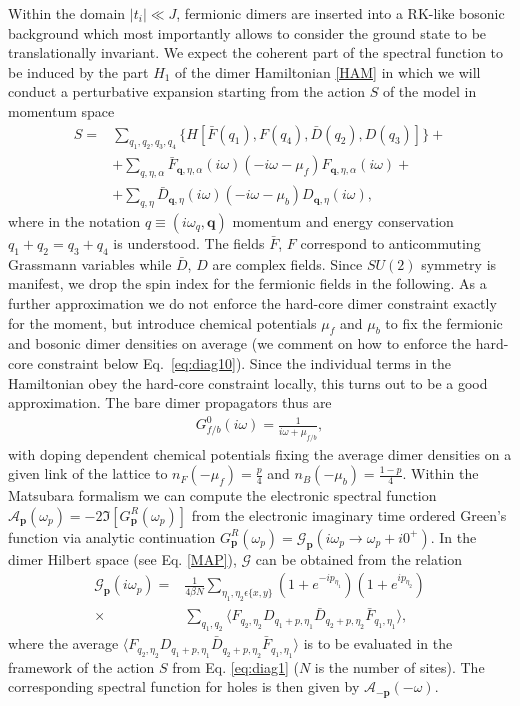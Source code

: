 \documentclass[aps,pra,reprint,showpacs,superscriptaddress]{revtex4-1}
\newcommand\bs[1]{\ensuremath{\boldsymbol{#1}}}
\begin{document}
Within the domain $|t_i|\ll J$, fermionic dimers are inserted into a RK-like bosonic background which most importantly allows to consider the ground state to be translationally invariant. We expect the coherent part of the spectral function to be induced by the part $H_1$ of the dimer Hamiltonian  \eqref{HAM} in which we will conduct a perturbative expansion starting from the action $S$ of the model in momentum space
\begin{align}
S= &\sum_{q_1,q_2,q_3,q_4} \biggl\{ H\left[\bar{F}(q_1),F(q_4),\bar{D}(q_2),D(q_3)\right]\biggr\}+ \label{eq:diag1} \\
&+ \sum_{q,\eta,\alpha}\bar{F}_{\bs{q},\eta,\alpha}(i\omega)\left(-i\omega-\mu_f\right)F_{\bs{q},\eta,\alpha}(i\omega)+ \nonumber\\
&+ \sum_{q,\eta}\bar{D}_{\bs{q},\eta}(i\omega)\left(-i\omega-\mu_b\right)D_{\bs{q},\eta}(i\omega),\nonumber
\end{align}
where in the notation $q\equiv (i\omega_q, \bs{q})$ momentum and energy conservation $q_1+q_2=q_3+q_4$ is understood. The fields $\bar{F}$, $F$ correspond to anticommuting Grassmann variables while $\bar{D}$, $D$ are complex fields. Since $SU(2)$ symmetry is manifest, we drop the spin index for the fermionic fields in the following. As a further approximation we do not enforce the hard-core dimer constraint exactly for the moment, but introduce chemical potentials $\mu_f$ and $\mu_b$ to fix the fermionic and bosonic dimer densities on average (we comment on how to enforce the hard-core constraint below Eq.~\eqref{eq:diag10}). Since the individual terms in the Hamiltonian obey the hard-core constraint locally, this turns out to be a good approximation. The bare dimer propagators thus are 
\begin{align}
G_{f/b}^0(i\omega)=\frac{1}{i\omega+\mu_{f/b}}, \label{eq:diag2}
\end{align}
with doping dependent chemical potentials fixing the average dimer densities on a given link of the lattice to $n_F(-\mu_f)=\frac{p}{4}$ and $n_B(-\mu_b)=\frac{1-p}{4}$. Within the Matsubara formalism we can compute the electronic spectral function $\mathcal{A}_{\bs{p}}(\omega_p)=-2\Im [G^R_{\bs{p}}(\omega_p)]$ from the electronic imaginary time ordered Green's function via analytic continuation $G^R_{\bs{p}}(\omega_p)=\mathcal{G}_{\bs{p}}(i\omega_p\rightarrow \omega_p+i0^+)$. In the dimer Hilbert space (see Eq. \eqref{MAP}), $\mathcal{G}$ can be obtained from the relation
\begin{align}
\mathcal{G}_{\bs{p}}(i\omega_p)=& \frac{1}{4\beta N}\sum_{\eta_1,\eta_2\epsilon\{x,y\}}\left(1+e^{-ip_{\eta_1}}\right)\left(1+e^{ip_{\eta_2}}\right) \label{eq:diag3}\\
\times & \sum_{q_1,q_2}\Big\langle F_{q_2,\eta_2}D_{q_1+p,\eta_1}\bar{D}_{q_2+p,\eta_2}\bar{F}_{q_1,\eta_1}\Big\rangle, \nonumber
\end{align}
where the average $\Big\langle F_{q_2,\eta_2}D_{q_1+p,\eta_1}\bar{D}_{q_2+p,\eta_2}\bar{F}_{q_1,\eta_1}\Big\rangle$ is to be evaluated in the framework of the action $S$ from Eq. \eqref{eq:diag1} ($N$ is the number of sites). The corresponding spectral function for holes is then given by $\mathcal{A}_{-\bs{p}}(-\omega)$.
\end{document}
